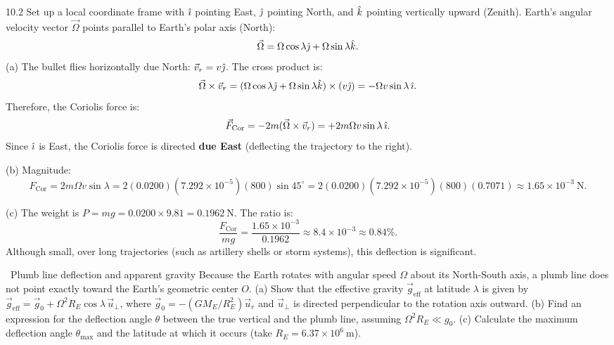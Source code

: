 \begin{tabletworkspace}[5.5cm]
\end{tabletworkspace}

\begin{solution}{10.2}
Set up a local coordinate frame with $\hat{\imath}$ pointing East, $\hat{\jmath}$ pointing North, and $\hat{k}$ pointing vertically upward (Zenith).
Earth's angular velocity vector $\vec{\Omega}$ points parallel to Earth's polar axis (North):
\[
\vec{\Omega} = \Omega\cos\lambda\hat{\jmath} + \Omega\sin\lambda\hat{k}.
\]
(a) The bullet flies horizontally due North: $\vec{v}_r = v\hat{\jmath}$.
The cross product is:
\[
\vec{\Omega}\times\vec{v}_r = (\Omega\cos\lambda\hat{\jmath} + \Omega\sin\lambda\hat{k})\times(v\hat{\jmath}) = -\Omega v\sin\lambda\,\hat{\imath}.
\]
Therefore, the Coriolis force is:
\[
\vec{F}_{\text{Cor}} = -2m(\vec{\Omega}\times\vec{v}_r) = +2m\Omega v\sin\lambda\,\hat{\imath}.
\]
Since $\hat{\imath}$ is East, the Coriolis force is directed \textbf{due East} (deflecting the trajectory to the right).

(b) Magnitude:
\[
F_{\text{Cor}} = 2m\Omega v\sin\lambda = 2(0.0200)(7.292\times 10^{-5})(800)\sin 45^\circ = 2(0.0200)(7.292\times 10^{-5})(800)(0.7071) \approx 1.65\times 10^{-3}\ \mathrm{N}.
\]

(c) The weight is $P = mg = 0.0200\times 9.81 = 0.1962\ \mathrm{N}$.
The ratio is:
\[
\frac{F_{\text{Cor}}}{mg} = \frac{1.65\times 10^{-3}}{0.1962} \approx 8.4\times 10^{-3} \approx 0.84\%.
\]
Although small, over long trajectories (such as artillery shells or storm systems), this deflection is significant.
\end{solution}

\begin{exercise}{\core\ Plumb line deflection and apparent gravity}
Because the Earth rotates with angular speed $\Omega$ about its North-South axis, a plumb line does not point exactly toward the Earth's geometric center $O$.
(a) Show that the effective gravity $\vec{g}_{\text{eff}}$ at latitude $\lambda$ is given by $\vec{g}_{\text{eff}} = \vec{g}_0 + \Omega^2 R_E\cos\lambda\,\vec{u}_\perp$, where $\vec{g}_0 = -(GM_E/R_E^2)\vec{u}_r$ and $\vec{u}_\perp$ is directed perpendicular to the rotation axis outward.
(b) Find an expression for the deflection angle $\theta$ between the true vertical and the plumb line, assuming $\Omega^2 R_E \ll g_0$.
(c) Calculate the maximum deflection angle $\theta_{\max}$ and the latitude at which it occurs (take $R_E = 6.37\times 10^6\ \mathrm{m}$).
\end{exercise}

